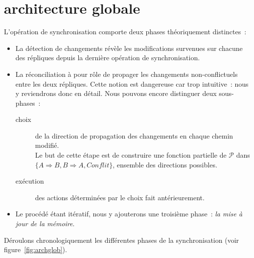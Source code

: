 \documentclass[11pt]{report}
\newcommand{\Conflit}{\ensuremath{\mathit{Conflit}}}
\begin{document}
        \section{architecture globale}
L'op\'eration de synchronisation comporte deux phases th\'eoriquement distinctes~: 
\begin{itemize}
\item La d\'etection de changements r\'ev\`ele les modifications survenues 
sur chacune des r\'epliques depuis la derni\`ere op\'eration de 
synchronisation.
\item La r\'econciliation \`a pour r\^ole de propager les changements 
non-conflictuels entre les deux r\'epliques. Cette notion est dangereuse car 
trop intuitive~: nous y reviendrons donc en d\'etail. Nous pouvons encore 
distinguer deux sous-phases~:
\begin{description}
\item [choix] de la direction de propagation des changements en chaque 
chemin modifi\'e.\\
Le but de cette \'etape est de construire une fonction partielle de 
$\mathcal{P}$ dans $\{A \Rightarrow B, B \Rightarrow A, \Conflit \}$, 
ensemble des directions possibles.
\item [ex\'ecution] des actions d\'etermin\'ees par le choix fait 
ant\'erieurement.
\end{description}
\item Le proc\'ed\'e \'etant it\'eratif, nous y ajouterons une troisi\`eme phase~: \emph{la mise \`a jour de la m\'emoire}.
\end{itemize}
D\'eroulons chronologiquement les diff\'erentes phases de la synchronisation
(voir figure~\ref{fig:archglob}).
\end{document}

